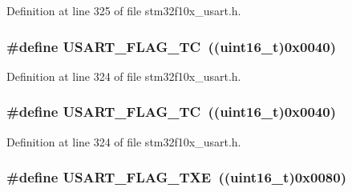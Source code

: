 Definition at line 325 of file stm32f10x\+\_\+usart.\+h.

\subsubsection[{\texorpdfstring{U\+S\+A\+R\+T\+\_\+\+F\+L\+A\+G\+\_\+\+TC}{USART_FLAG_TC}}]{\setlength{\rightskip}{0pt plus 5cm}\#define U\+S\+A\+R\+T\+\_\+\+F\+L\+A\+G\+\_\+\+TC~(({\bf uint16\+\_\+t})0x0040)}\hypertarget{group___u_s_a_r_t___flags_gae7b85c9e2cc86af5bbc8b8d8b854410f}{}\label{group___u_s_a_r_t___flags_gae7b85c9e2cc86af5bbc8b8d8b854410f}


Definition at line 324 of file stm32f10x\+\_\+usart.\+h.

\subsubsection[{\texorpdfstring{U\+S\+A\+R\+T\+\_\+\+F\+L\+A\+G\+\_\+\+TC}{USART_FLAG_TC}}]{\setlength{\rightskip}{0pt plus 5cm}\#define U\+S\+A\+R\+T\+\_\+\+F\+L\+A\+G\+\_\+\+TC~(({\bf uint16\+\_\+t})0x0040)}\hypertarget{group___u_s_a_r_t___flags_gae7b85c9e2cc86af5bbc8b8d8b854410f}{}\label{group___u_s_a_r_t___flags_gae7b85c9e2cc86af5bbc8b8d8b854410f}


Definition at line 324 of file stm32f10x\+\_\+usart.\+h.

\subsubsection[{\texorpdfstring{U\+S\+A\+R\+T\+\_\+\+F\+L\+A\+G\+\_\+\+T\+XE}{USART_FLAG_TXE}}]{\setlength{\rightskip}{0pt plus 5cm}\#define U\+S\+A\+R\+T\+\_\+\+F\+L\+A\+G\+\_\+\+T\+XE~(({\bf uint16\+\_\+t})0x0080)}\hypertarget{group___u_s_a_r_t___flags_ga7129f13333f2a7218838cc32fe507bfa}{}\label{group___u_s_a_r_t___flags_ga7129f13333f2a7218838cc32fe507bfa}


